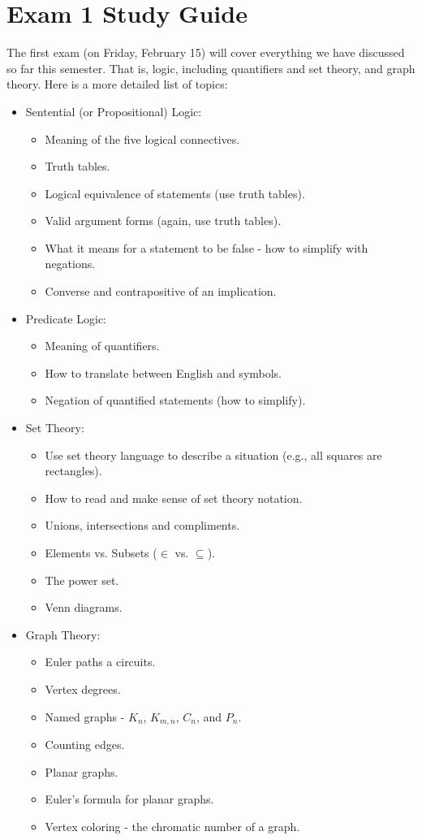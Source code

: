 

\section{Exam 1 Study Guide}

The first exam (on Friday, February 15) will cover everything we have discussed so far this semester.  That is, logic, including quantifiers and set theory, and graph theory.  Here is a more detailed list of topics:

\begin{itemize}
 \item Sentential (or Propositional) Logic:
 \begin{itemize}
  \item Meaning of the five logical connectives.
  \item Truth tables.
  \item Logical equivalence of statements (use truth tables).
  \item Valid argument forms (again, use truth tables).
  \item What it means for a statement to be false - how to simplify with negations.
  \item Converse and contrapositive of an implication.
 \end{itemize}
  \item Predicate Logic:
  \begin{itemize}
   \item Meaning of quantifiers.
   \item How to translate between English and symbols.
   \item Negation of quantified statements (how to simplify).
  \end{itemize}
  \item Set Theory:
  \begin{itemize}
   \item Use set theory language to describe a situation (e.g., all squares are rectangles).
   \item How to read and make sense of set theory notation.
   \item Unions, intersections and compliments.
   \item Elements vs. Subsets ($\in$ vs. $\subseteq$).
   \item The power set.
   \item Venn diagrams.
  \end{itemize}
  \item Graph Theory:
  \begin{itemize}
   \item Euler paths a circuits.
   \item Vertex degrees.
   \item Named graphs - $K_n$, $K_{m,n}$, $C_n$, and $P_n$.  
   \item Counting edges.
   \item Planar graphs.
   \item Euler's formula for planar graphs.
   \item Vertex coloring - the chromatic number of a graph.
  \end{itemize}

\end{itemize}


